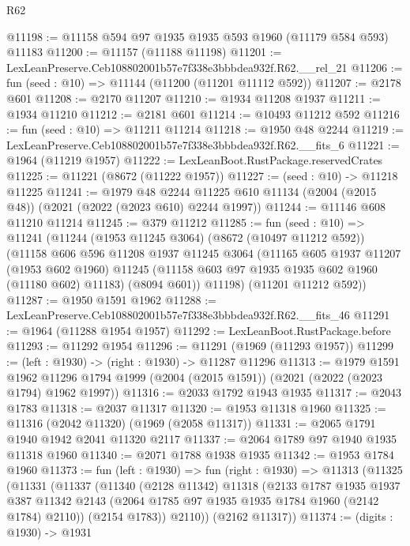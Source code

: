 \begin{lexlean}{R62}
\begin{coremodule}
@11198 := @11158 @594 @97 @1935 @1935 @593 @1960 (@11179 @584 @593) @11183
@11200 := @11157 (@11188 @11198)
@11201 := LexLeanPreserve.Ceb108802001b57e7f338e3bbbdea932f.R62.__rel_21
@11206 := fun (seed : @10) => @11144 (@11200 (@11201 @11112 @592))
@11207 := @2178 @601
@11208 := @2170 @11207
@11210 := @1934 @11208 @1937
@11211 := @1934 @11210
@11212 := @2181 @601
@11214 := @10493 @11212 @592
@11216 := fun (seed : @10) => @11211 @11214
@11218 := @1950 @48 @2244
@11219 := LexLeanPreserve.Ceb108802001b57e7f338e3bbbdea932f.R62.__fits_6
@11221 := @1964 (@11219 @1957)
@11222 := LexLeanBoot.RustPackage.reservedCrates
@11225 := @11221 (@8672 (@11222 @1957))
@11227 := (seed : @10) -> @11218 @11225
@11241 := @1979
    @48
    @2244
    @11225
    @610
    @11134
    (@2004 (@2015 @48))
    (@2021 (@2022 (@2023 @610) @2244 @1997))
@11244 := @11146 @608 @11210 @11214
@11245 := @379 @11212
@11285 := fun (seed : @10) =>
  @11241
    (@11244
      (@1953 @11245 @3064)
      (@8672 (@10497 @11212 @592))
      (@11158
        @606
        @596
        @11208
        @1937
        @11245
        @3064
        (@11165
          @605
          @1937
          @11207
          (@1953 @602 @1960)
          @11245
          (@11158 @603 @97 @1935 @1935 @602 @1960 (@11180 @602) @11183)
          (@8094 @601))
        @11198)
      (@11201 @11212 @592))
@11287 := @1950 @1591 @1962
@11288 := LexLeanPreserve.Ceb108802001b57e7f338e3bbbdea932f.R62.__fits_46
@11291 := @1964 (@11288 @1954 @1957)
@11292 := LexLeanBoot.RustPackage.before
@11293 := @11292 @1954
@11296 := @11291 (@1969 (@11293 @1957))
@11299 := (left : @1930) -> (right : @1930) -> @11287 @11296
@11313 := @1979
    @1591
    @1962
    @11296
    @1794
    @1999
    (@2004 (@2015 @1591))
    (@2021 (@2022 (@2023 @1794) @1962 @1997))
@11316 := @2033 @1792 @1943 @1935
@11317 := @2043 @1783
@11318 := @2037 @11317
@11320 := @1953 @11318 @1960
@11325 := @11316 (@2042 @11320) (@1969 (@2058 @11317))
@11331 := @2065 @1791 @1940 @1942 @2041 @11320 @2117
@11337 := @2064 @1789 @97 @1940 @1935 @11318 @1960
@11340 := @2071 @1788 @1938 @1935
@11342 := @1953 @1784 @1960
@11373 := fun (left : @1930) =>
  fun (right : @1930) =>
  @11313
    (@11325
      (@11331
        (@11337
          (@11340
            (@2128 @11342)
            @11318
            (@2133
              @1787
              @1935
              @1937
              @387
              @11342
              @2143
              (@2064 @1785 @97 @1935 @1935 @1784 @1960 (@2142 @1784) @2110))
            (@2154 @1783))
          @2110))
      (@2162 @11317))
@11374 := (digits : @1930) -> @1931

\end{coremodule}
\end{lexlean}
